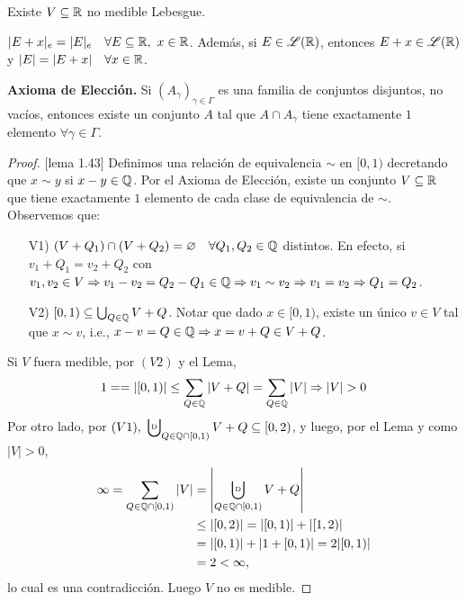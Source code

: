 \begin{theorem}
	Existe $V \subseteq \mathbb{R}$ no medible Lebesgue.
\end{theorem}

\begin{lemma}
	$|E + x|_{e} = |E|_{e} \quad \forall E \subseteq \mathbb{R},\ x \in \mathbb{R}$. Además, si $E \in \mathscr{L}(\mathbb{R})$, entonces $E+x \in \mathscr{L}(\mathbb{R})$ y $|E| = |E + x| \quad \forall x \in \mathbb{R}$.
\end{lemma}

\noindent \textbf{Axioma de Elección.} Si $(A_{\gamma})_{\gamma\in\Gamma}$ es una familia de conjuntos disjuntos, no vacíos, entonces existe un conjunto $A$ tal que $A \cap A_{\gamma}$ tiene exactamente $1$ elemento $\forall \gamma \in \Gamma$.

\begin{proof}[Proof][lema 1.43]
	Definimos una relación de equivalencia $\sim$ en $[0,1)$ decretando que $x \sim y$ si $x-y \in \mathbb{Q}$. Por el Axioma de Elección, existe un conjunto $V \subseteq \mathbb{R}$ que tiene exactamente $1$ elemento de cada clase de equivalencia de $\sim$. Observemos que:
	\begin{enumerate}
		\item[V1)] $(V + Q_1) \cap (V + Q_2) = \varnothing \quad \forall Q_1,Q_2 \in \mathbb{Q}$ distintos. En efecto, si $v_1 + Q_1 = v_2 + Q_2$ con $v_1,v_2 \in V \Rightarrow v_1 - v_2 = Q_2 - Q_1 \in \mathbb{Q} \Rightarrow v_1 \sim v_2 \Rightarrow v_1 = v_2 \Rightarrow Q_1 = Q_2$.

		\item[V2)] $[0,1) \subseteq \bigcup_{Q \in \mathbb{Q}} V + Q$. Notar que dado $x\in[0,1)$, existe un único $v \in V$ tal que $x \sim v$, i.e., $x-v = Q \in \mathbb{Q} \Rightarrow x = v + Q \in V + Q$.
	\end{enumerate}
	Si $V$ fuera medible, por $(V2)$ y el Lema,
	\[ 1 = = |[0,1)| \leq \sum_{Q \in \mathbb{Q}} |V+Q| = \sum_{Q\in\mathbb{Q}} |V| \Rightarrow |V| > 0 \]
	Por otro lado, por $(V1),\ \bigcupd_{Q \in \Q \cap [0,1)} V+Q \subseteq [0,2)$, y luego, por el Lema y como $|V| > 0$,
	\begin{align*}
		\infty = \sum_{Q \in \Q \cap [0,1)} |V| &= \left| \bigcupd_{Q\in\Q\cap[0,1)} V+Q \right| \\
		& \leq |[0,2)| = |[0,1)| + |[1,2)| \\
		&= |[0,1)| + | 1 + [0,1)| = 2|[0,1)| \\
		&= 2 < \infty
	,\end{align*}
	lo cual es una contradicción. Luego $V$ no es medible.
\end{proof}
